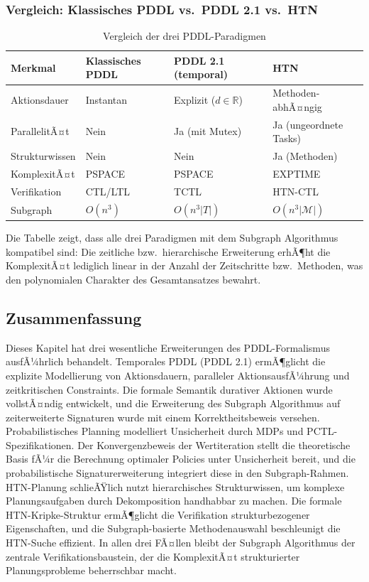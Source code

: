 ﻿\documentclass[a4paper,12pt]{article}
\theoremstyle{definition}
\begin{document}
\subsubsection{Vergleich: Klassisches PDDL vs.\ PDDL 2.1 vs.\ HTN}

\begin{table}[h]
  \centering
  \caption{Vergleich der drei PDDL-Paradigmen}
  \label{tab:pddl_paradigmen}
  \begin{tabular}{p{2.4cm}p{2.8cm}p{3.0cm}p{2.8cm}}
    \toprule
    Merkmal & Klassisches PDDL & PDDL 2.1 (temporal) & HTN \\
    \midrule
    Aktionsdauer & Instantan & Explizit ($d \in \mathbb{R}$) & Methoden-abhÃ¤ngig \\
    ParallelitÃ¤t & Nein & Ja (mit Mutex) & Ja (ungeordnete Tasks) \\
    Struktur\-wissen & Nein & Nein & Ja (Methoden) \\
    KomplexitÃ¤t & PSPACE & PSPACE & EXPTIME \\
    Verifikation & CTL/LTL & TCTL & HTN-CTL \\
    Subgraph & $O(n^3)$ & $O(n^3 |T|)$ & $O(n^3 |\mathcal{M}|)$ \\
    \bottomrule
  \end{tabular}
\end{table}

Die Tabelle zeigt, dass alle drei Paradigmen mit dem Subgraph Algorithmus kompatibel sind: Die zeitliche bzw.\ hierarchische Erweiterung erhÃ¶ht die KomplexitÃ¤t lediglich linear in der Anzahl der Zeitschritte bzw.\ Methoden, was den polynomialen Charakter des Gesamtansatzes bewahrt.

\subsection{Zusammenfassung}

Dieses Kapitel hat drei wesentliche Erweiterungen des PDDL-Formalismus ausfÃ¼hrlich behandelt. Temporales PDDL (PDDL 2.1) ermÃ¶glicht die explizite Modellierung von Aktionsdauern, paralleler AktionsausfÃ¼hrung und zeitkritischen Constraints. Die formale Semantik durativer Aktionen wurde vollstÃ¤ndig entwickelt, und die Erweiterung des Subgraph Algorithmus auf zeiterweiterte Signaturen wurde mit einem Korrektheitsbeweis versehen. Probabilistisches Planning modelliert Unsicherheit durch MDPs und PCTL-Spezifikationen. Der Konvergenzbeweis der Wertiteration stellt die theoretische Basis fÃ¼r die Berechnung optimaler Policies unter Unsicherheit bereit, und die probabilistische Signaturerweiterung integriert diese in den Subgraph-Rahmen. HTN-Planung schlieÃŸlich nutzt hierarchisches Strukturwissen, um komplexe Planungsaufgaben durch Dekomposition handhabbar zu machen. Die formale HTN-Kripke-Struktur ermÃ¶glicht die Verifikation strukturbezogener Eigenschaften, und die Subgraph-basierte Methodenauswahl beschleunigt die HTN-Suche effizient. In allen drei FÃ¤llen bleibt der Subgraph Algorithmus der zentrale Verifikationsbaustein, der die KomplexitÃ¤t strukturierter Planungsprobleme beherrschbar macht.
\end{document}
